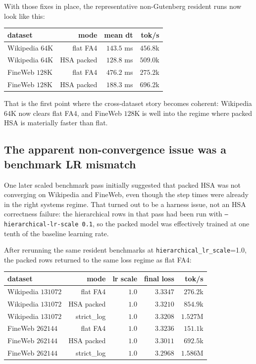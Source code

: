 \documentclass[11pt]{article}
\begin{document}
With those fixes in place, the representative non-Gutenberg resident runs now
look like this:
\begin{center}
\begin{tabular}{lrrr}
\toprule
dataset & mode & mean dt & tok/s \\
\midrule
Wikipedia $64$K & flat FA4 & $143.5$ ms & $456.8$k \\
Wikipedia $64$K & HSA packed & $128.8$ ms & $509.0$k \\
FineWeb $128$K & flat FA4 & $476.2$ ms & $275.2$k \\
FineWeb $128$K & HSA packed & $188.3$ ms & $696.2$k \\
\bottomrule
\end{tabular}
\end{center}

That is the first point where the cross-dataset story becomes coherent:
Wikipedia \(64\)K now clears flat FA4, and FineWeb \(128\)K is well into the
regime where packed HSA is materially faster than flat.

\subsection{The apparent non-convergence issue was a benchmark LR mismatch}

One later scaled benchmark pass initially suggested that packed HSA was not
converging on Wikipedia and FineWeb, even though the step times were already in
the right systems regime. That turned out to be a harness issue, not an HSA
correctness failure: the hierarchical rows in that pass had been run with
\texttt{--hierarchical-lr-scale 0.1}, so the packed model was effectively
trained at one tenth of the baseline learning rate.

After rerunning the same resident benchmarks at
\texttt{hierarchical\_lr\_scale}=1.0, the packed rows returned to the same loss
regime as flat FA4:
\begin{center}
\begin{tabular}{lrrrr}
\toprule
dataset & mode & lr scale & final loss & tok/s \\
\midrule
Wikipedia $131072$ & flat FA4 & $1.0$ & $3.3347$ & $276.2$k \\
Wikipedia $131072$ & HSA packed & $1.0$ & $3.3210$ & $854.9$k \\
Wikipedia $131072$ & strict\_log & $1.0$ & $3.3208$ & $1.527$M \\
FineWeb $262144$ & flat FA4 & $1.0$ & $3.3236$ & $151.1$k \\
FineWeb $262144$ & HSA packed & $1.0$ & $3.3011$ & $692.5$k \\
FineWeb $262144$ & strict\_log & $1.0$ & $3.2968$ & $1.586$M \\
\bottomrule
\end{tabular}
\end{center}
\end{document}

